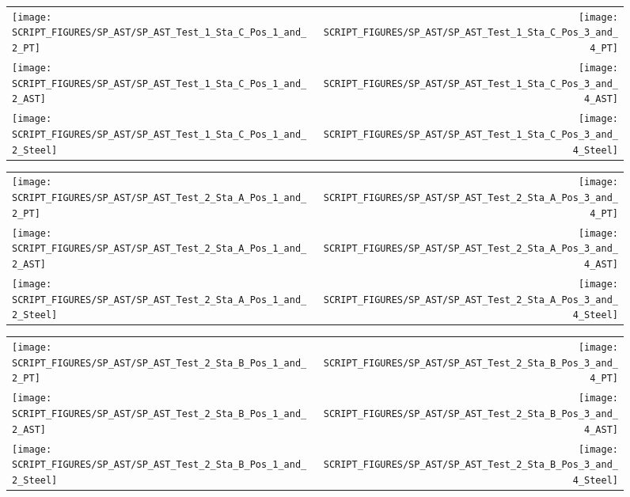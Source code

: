 \begin{figure}[p]
\begin{tabular*}{\textwidth}{l@{\extracolsep{\fill}}r}
\texttt{[image: SCRIPT\_FIGURES/SP\_AST/SP\_AST\_Test\_1\_Sta\_C\_Pos\_1\_and\_2\_PT]} &
\texttt{[image: SCRIPT\_FIGURES/SP\_AST/SP\_AST\_Test\_1\_Sta\_C\_Pos\_3\_and\_4\_PT]} \\
\texttt{[image: SCRIPT\_FIGURES/SP\_AST/SP\_AST\_Test\_1\_Sta\_C\_Pos\_1\_and\_2\_AST]} &
\texttt{[image: SCRIPT\_FIGURES/SP\_AST/SP\_AST\_Test\_1\_Sta\_C\_Pos\_3\_and\_4\_AST]} \\
\texttt{[image: SCRIPT\_FIGURES/SP\_AST/SP\_AST\_Test\_1\_Sta\_C\_Pos\_1\_and\_2\_Steel]} &
\texttt{[image: SCRIPT\_FIGURES/SP\_AST/SP\_AST\_Test\_1\_Sta\_C\_Pos\_3\_and\_4\_Steel]}
\end{tabular*}
\label{SP_Test_1_Station_C}
\end{figure}


\begin{figure}[p]
\begin{tabular*}{\textwidth}{l@{\extracolsep{\fill}}r}
\texttt{[image: SCRIPT\_FIGURES/SP\_AST/SP\_AST\_Test\_2\_Sta\_A\_Pos\_1\_and\_2\_PT]} &
\texttt{[image: SCRIPT\_FIGURES/SP\_AST/SP\_AST\_Test\_2\_Sta\_A\_Pos\_3\_and\_4\_PT]} \\
\texttt{[image: SCRIPT\_FIGURES/SP\_AST/SP\_AST\_Test\_2\_Sta\_A\_Pos\_1\_and\_2\_AST]} &
\texttt{[image: SCRIPT\_FIGURES/SP\_AST/SP\_AST\_Test\_2\_Sta\_A\_Pos\_3\_and\_4\_AST]} \\
\texttt{[image: SCRIPT\_FIGURES/SP\_AST/SP\_AST\_Test\_2\_Sta\_A\_Pos\_1\_and\_2\_Steel]} &
\texttt{[image: SCRIPT\_FIGURES/SP\_AST/SP\_AST\_Test\_2\_Sta\_A\_Pos\_3\_and\_4\_Steel]}
\end{tabular*}
\label{SP_Test_2_Station_A}
\end{figure}

\begin{figure}[p]
\begin{tabular*}{\textwidth}{l@{\extracolsep{\fill}}r}
\texttt{[image: SCRIPT\_FIGURES/SP\_AST/SP\_AST\_Test\_2\_Sta\_B\_Pos\_1\_and\_2\_PT]} &
\texttt{[image: SCRIPT\_FIGURES/SP\_AST/SP\_AST\_Test\_2\_Sta\_B\_Pos\_3\_and\_4\_PT]} \\
\texttt{[image: SCRIPT\_FIGURES/SP\_AST/SP\_AST\_Test\_2\_Sta\_B\_Pos\_1\_and\_2\_AST]} &
\texttt{[image: SCRIPT\_FIGURES/SP\_AST/SP\_AST\_Test\_2\_Sta\_B\_Pos\_3\_and\_4\_AST]} \\
\texttt{[image: SCRIPT\_FIGURES/SP\_AST/SP\_AST\_Test\_2\_Sta\_B\_Pos\_1\_and\_2\_Steel]} &
\texttt{[image: SCRIPT\_FIGURES/SP\_AST/SP\_AST\_Test\_2\_Sta\_B\_Pos\_3\_and\_4\_Steel]}
\end{tabular*}
\label{SP_Test_2_Station_B}
\end{figure}

